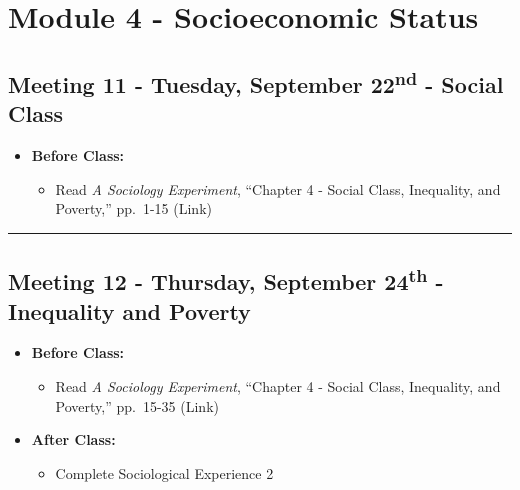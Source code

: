 \documentclass[
]{book}
\providecommand{\tightlist}{%
  \setlength{\itemsep}{0pt}\setlength{\parskip}{0pt}}
\begin{document}
\newpage

\hypertarget{module-4---socioeconomic-status}{%
\section{Module 4 - Socioeconomic Status}\label{module-4---socioeconomic-status}}

\hypertarget{meeting-11---tuesday-september-22nd---social-class}{%
\subsection*{\texorpdfstring{Meeting 11 - Tuesday, September 22\textsuperscript{nd} - Social Class}{Meeting 11 - Tuesday, September 22nd - Social Class}}\label{meeting-11---tuesday-september-22nd---social-class}}

\begin{itemize}
\tightlist
\item
  \textbf{Before Class:}

  \begin{itemize}
  \tightlist
  \item
    Read \emph{A Sociology Experiment}, ``Chapter 4 - Social Class, Inequality, and Poverty,'' pp.~1-15 (Link)
  \end{itemize}
\end{itemize}

\begin{center}\rule{0.5\linewidth}{0.5pt}\end{center}

\hypertarget{meeting-12---thursday-september-24th---inequality-and-poverty}{%
\subsection*{\texorpdfstring{Meeting 12 - Thursday, September 24\textsuperscript{th} - Inequality and Poverty}{Meeting 12 - Thursday, September 24th - Inequality and Poverty}}\label{meeting-12---thursday-september-24th---inequality-and-poverty}}

\begin{itemize}
\tightlist
\item
  \textbf{Before Class:}

  \begin{itemize}
  \tightlist
  \item
    Read \emph{A Sociology Experiment}, ``Chapter 4 - Social Class, Inequality, and Poverty,'' pp.~15-35 (Link)
  \end{itemize}
\item
  \textbf{After Class:}

  \begin{itemize}
  \tightlist
  \item
    Complete Sociological Experience 2
  \end{itemize}
\end{itemize}
\end{document}
